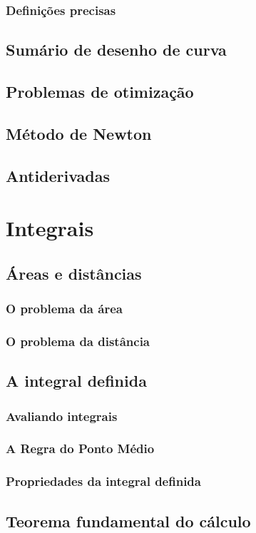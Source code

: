 \subsubsection{Definições precisas}
\subsection{Sumário de desenho de curva}
\subsection{Problemas de otimização}
\subsection{Método de Newton}
\subsection{Antiderivadas}

\section{Integrais}
\subsection{Áreas e distâncias}
\subsubsection{O problema da área}
\subsubsection{O problema da distância}
\subsection{A integral definida}
\subsubsection{Avaliando integrais}
\subsubsection{A Regra do Ponto Médio}
\subsubsection{Propriedades da integral definida}
\subsection{Teorema fundamental do cálculo}
